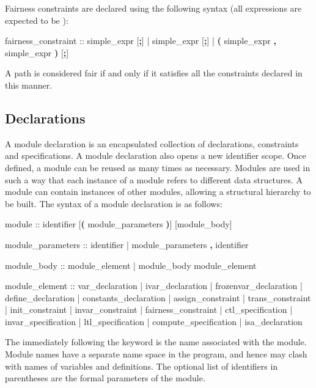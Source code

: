 Fairness constraints are declared using the following syntax (all
expressions are expected to be \Boolean):
%
\begin{Grammar}
fairness_constraint ::
        simple_expr [\textbf{;}]
     |  simple_expr [\textbf{;}]
     |  \textbf{(} simple_expr \textbf{,} simple_expr \textbf{)} [\textbf{;}]
\end{Grammar}
%
A path is considered fair if and only if it satisfies all the
constraints declared in this manner.


\subsection { Declarations}
\label{MODULE Declarations}
%
A module declaration is an encapsulated collection of declarations,
constraints and specifications. 
%
A module declaration also opens a new
identifier scope.
%
Once defined, a module can be reused as many times as
necessary. 
%
Modules are used in such a way that each instance of a module refers to
different data structures. 
%
A module can contain instances of other modules, allowing a structural
hierarchy to be built. 
%
The syntax of a module declaration is as follows:
%
\begin{Grammar}
module ::  identifier [\textbf{(} module_parameters \textbf{)}] [module_body]

module_parameters ::
          identifier
        | module_parameters \textbf{,} identifier

module_body :: 
          module_element 
        | module_body module_element
           
module_element ::
          var_declaration
        | ivar_declaration
        | frozenvar_declaration
        | define_declaration
        | constants_declaration
        | assign_constraint
        | trans_constraint
        | init_constraint
        | invar_constraint
        | fairness_constraint
        | ctl_specification
        | invar_specification
        | ltl_specification
        | compute_specification
        | isa_declaration
\end{Grammar}
%
The  immediately following the keyword
 is the name associated with the module. 
%
Module names have a separate name space in the program, and hence may
clash with names of variables and definitions. 
%
The optional list of identifiers in parentheses are the formal
parameters of the module.

